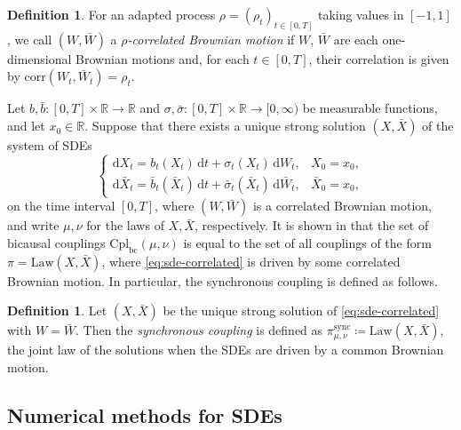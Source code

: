 \documentclass[onseside, final]{amsart}
\theoremstyle{definition}
\newtheorem{definition}[theorem]{Definition}
\newcommand{\R}{\mathbb R}
\newcommand{\Law}{\mathrm{Law}}
\newcommand{\corr}{\mathrm{corr}}
\newcommand{\D}{\,\mathrm{d}}
\newcommand{\ds}{\mathrm{d}}
\newcommand{\cpl}{\mathrm{Cpl}}
\newcommand{\cplba}{\cpl_{\mathrm{bc}}}
\newcommand{\sync}{\mathrm{sync}}
\numberwithin{equation}{section}
\begin{document}
			\begin{definition}
				For an adapted process $\rho = (\rho_t)_{t \in [0, T]}$ taking values in $[-1, 1]$, we call $(W, \bar W)$ a \emph{$\rho$-correlated Brownian motion} if $W$, $\bar W$ are each one-dimensional Brownian motions and, for each $t \in [0, T]$, their correlation is given by $\corr(W_t, \bar W_t) = \rho_t$.
			\end{definition}
			
			Let $b, \bar b \colon [0, T] \times \R \to \R$ and $\sigma, \bar \sigma \colon [0, T] \times \R \to [0, \infty)$ be measurable functions, and let $x_0 \in \R$. Suppose that there exists a unique strong solution $(X, \bar X)$ of the system of SDEs
			\begin{equation}\label{eq:sde-correlated}
				\begin{cases}
					\ds X_t = b_t(X_t) \D t + \sigma_t(X_t) \D W_t, & X_0 = x_0, \\
					\ds \bar X_t = \bar b_t(\bar X_t) \D t + \bar \sigma_t(\bar X_t) \D \bar W_t, & \bar X_0 = x_0,
				\end{cases}
			\end{equation}
			on the time interval $[0, T]$, where $(W, \bar W)$ is a correlated Brownian motion, and write $\mu, \nu$ for the laws of $X, \bar X$, respectively. It is shown in \citep[Proposition 2.2]{BaKaRo22} that the set of bicausal couplings $\cplba (\mu, \nu)$ is equal to the set of all couplings of the form $\pi = \Law(X, \bar X)$, where \eqref{eq:sde-correlated} is driven by some correlated Brownian motion. In particular, the synchronous coupling is defined as follows.
			
			\begin{definition}\label{def:synchronous}
				 Let $(X, \bar X)$ be the unique strong solution of \eqref{eq:sde-correlated} with $W = \bar W$. Then the \emph{synchronous coupling} is defined as $\pi^\sync_{\mu, \nu} \coloneqq \Law(X, \bar X)$, the joint law of the solutions when the SDEs are driven by a common Brownian motion.
			\end{definition}
			
		\subsection{Numerical methods for SDEs}\label{sec:num-sdes}
			
\end{document}
